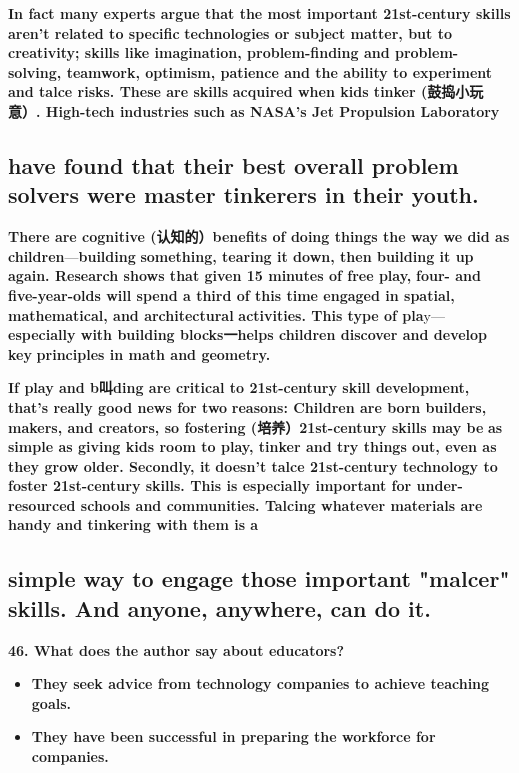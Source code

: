\documentclass[UTF8,11pt]{ctexart}
\begin{document}
\textbf{In fact many experts argue that the most important 21st-century skills aren't related to specific} \textbf{technologies or subject matter, but to creativity; skills like imagination, problem-finding and problem-} \textbf{solving, teamwork, optimism, patience and the ability to experiment and talce risks. These are skills} \textbf{acquired when kids tinker (鼓捣小玩意）. High-tech industries such as NASA's Jet Propulsion Laboratory}


\subsection*{\textbf{have found that their best overall problem solvers were master tinkerers in their youth.}}


\textbf{There are cognitive (认知的）benefits of doing things the way we did as children}—\textbf{building} \textbf{something, tearing it down, then building it up again. Research shows that given 15 minutes of free play,} \textbf{four- and five-year-olds will spend a third of this time engaged in spatial, mathematical, and architectural} \textbf{activities. This type of pla}y—\textbf{especially with building blocks一helps children discover and develop key} \textbf{principles in math and geometry.}


\textbf{If play and b叫ding are critical to 21st-century skill development, that's really good news for two} \textbf{reasons: Children are born builders, makers, and creators, so fostering (培养）21st-century skills may be} \textbf{as simple as giving kids room to play, tinker and try things out, even as they grow older. Secondly, it} \textbf{doesn't talce 21st-century technology to foster 21st-century skills. This is especially important for under-} \textbf{resourced schools and communities. Talcing whatever materials are handy and tinkering with them is a}


\subsection*{\textbf{simple way to engage those important "malcer" skills. And anyone, anywhere, can do it.}}


\textbf{46. What does the author say about educators?}


\begin{itemize}[leftmargin=2em,itemsep=.2em,topsep=.4em]\item[A.] \textbf{They seek advice from technology companies to achieve teaching goals.}
\item[B.] \textbf{They have been successful in preparing the workforce for companies.}
\end{itemize}
\end{document}
